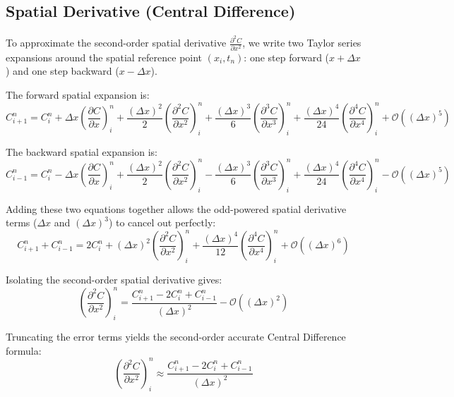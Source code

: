 \subsection*{Spatial Derivative (Central Difference)}
\paragraph{}
To approximate the second-order spatial derivative $\frac{\partial^2 C}{\partial x^2}$, we write two Taylor series expansions around the spatial reference point $(x_i, t_n)$: one step forward ($x + \Delta x$) and one step backward ($x - \Delta x$).

The forward spatial expansion is:
\begin{equation*}
C_{i+1}^n = C_i^n + \Delta x \left( \frac{\partial C}{\partial x} \right)_i^n + \frac{(\Delta x)^2}{2} \left( \frac{\partial^2 C}{\partial x^2} \right)_i^n + \frac{(\Delta x)^3}{6} \left( \frac{\partial^3 C}{\partial x^3} \right)_i^n + \frac{(\Delta x)^4}{24} \left( \frac{\partial^4 C}{\partial x^4} \right)_i^n + \mathcal{O}((\Delta x)^5)
\end{equation*}

The backward spatial expansion is:
\begin{equation*}
C_{i-1}^n = C_i^n - \Delta x \left( \frac{\partial C}{\partial x} \right)_i^n + \frac{(\Delta x)^2}{2} \left( \frac{\partial^2 C}{\partial x^2} \right)_i^n - \frac{(\Delta x)^3}{6} \left( \frac{\partial^3 C}{\partial x^3} \right)_i^n + \frac{(\Delta x)^4}{24} \left( \frac{\partial^4 C}{\partial x^4} \right)_i^n - \mathcal{O}((\Delta x)^5)
\end{equation*}

Adding these two equations together allows the odd-powered spatial derivative terms ($\Delta x$ and $(\Delta x)^3$) to cancel out perfectly:
\begin{equation*}
C_{i+1}^n + C_{i-1}^n = 2C_i^n + (\Delta x)^2 \left( \frac{\partial^2 C}{\partial x^2} \right)_i^n + \frac{(\Delta x)^4}{12} \left( \frac{\partial^4 C}{\partial x^4} \right)_i^n + \mathcal{O}((\Delta x)^6)
\end{equation*}

Isolating the second-order spatial derivative gives:
\begin{equation*}
\left( \frac{\partial^2 C}{\partial x^2} \right)_i^n = \frac{C_{i+1}^n - 2C_i^n + C_{i-1}^n}{(\Delta x)^2} - \mathcal{O}((\Delta x)^2)
\end{equation*}

Truncating the error terms yields the second-order accurate Central Difference formula:
\begin{equation}
\label{eq:ftcscd}
\left( \frac{\partial^2 C}{\partial x^2} \right)_i^n \approx \frac{C_{i+1}^n - 2C_i^n + C_{i-1}^n}{(\Delta x)^2}
\end{equation}

